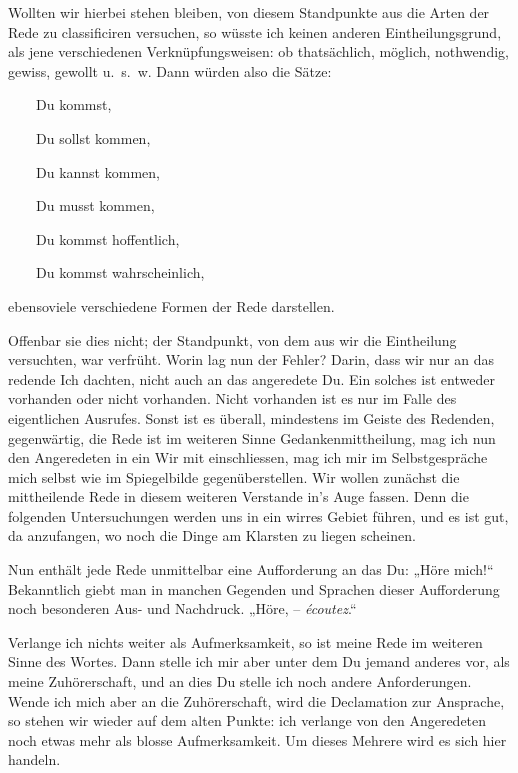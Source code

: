 \largerpage
Wollten wir hierbei stehen bleiben, von diesem Standpunkte aus die Arten der Rede zu classificiren versuchen, so wüsste ich keinen anderen Eintheilungs\-\label{sp.318}grund, als jene verschiedenen Verknüpfungsweisen: ob thatsächlich, möglich, nothwendig, gewiss, gewollt u.~s.~w. Dann würden also die Sätze:

~~~~Du kommst,

~~~~Du sollst kommen,

~~~~Du kannst kommen, 

~~~~Du musst kommen, 

~~~~Du kommst hoffentlich, 

~~~~Du kommst wahrscheinlich, 

\largerpage[-1]\noindent ebensoviele verschiedene Formen der Rede darstellen.

Offenbar  sie dies nicht; der Standpunkt, von dem aus wir die Eintheilung versuchten, war verfrüht. Worin lag nun der Fehler? Darin, dass wir nur an das redende Ich dachten, nicht auch an das angeredete Du. Ein solches ist entweder vorhanden oder nicht vorhanden. Nicht vorhanden ist es nur im Falle des eigentlichen Ausrufes. Sonst ist es überall, mindestens im Geiste des Redenden, gegenwärtig, die Rede ist im weiteren Sinne Gedankenmittheilung, mag ich nun den Angeredeten in ein Wir mit einschliessen, mag ich mir im Selbstgespräche mich selbst \label{fp.309} wie im Spiegelbilde gegenüberstellen. Wir wollen zunächst die mittheilende Rede in diesem weiteren Verstande in’s Auge fassen. Denn die folgenden Untersuchungen werden uns in ein wirres Gebiet führen, und es ist gut, da anzufangen, wo noch die Dinge am Klarsten zu liegen scheinen.

Nun enthält jede Rede unmittelbar eine Aufforderung an das Du: „Höre mich!“ Bekanntlich giebt man in manchen Gegenden und Sprachen dieser Aufforderung noch besonderen Aus- und Nachdruck. „Höre, – \textit{écoutez}.“

Verlange ich nichts weiter als Aufmerksamkeit, so ist meine Rede  im weiteren Sinne des Wortes. Dann stelle ich mir aber unter dem Du jemand anderes vor, als meine Zuhörerschaft, und an dies Du stelle ich noch andere Anforderungen. Wende ich mich aber an die Zuhörerschaft, wird die Declamation zur Ansprache, so stehen wir wieder auf dem alten Punkte: ich verlange von den Angeredeten noch etwas mehr als blosse Aufmerksamkeit. Um dieses Mehrere wird es sich hier handeln.

